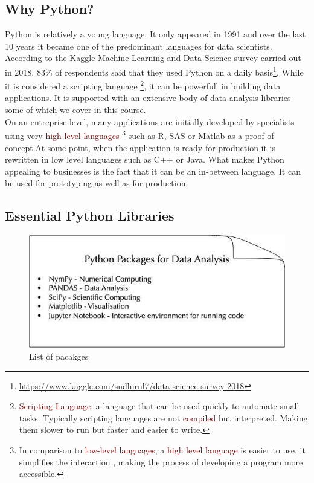 \documentclass{tufte-handout}
\newcommand{\hlred}[1]{\textcolor{Maroon}{#1}}%
\begin{document}
\subsection{Why Python?}\label{sec:why}
Python is relatively a young language. It only appeared in 1991 and over the last 10 years it became one of the predominant languages for data scientists. According to the Kaggle Machine Learning and Data Science  survey carried out in 2018, 83\% of respondents said that they used Python on a daily basis\footnote{\url{https://www.kaggle.com/sudhirnl7/data-science-survey-2018}}. While it is considered a scripting language \footnote{\hlred{Scripting Language}: a language that can be used quickly to automate small tasks. Typically scripting languages are not \hlred{compiled} but interpreted. Making them slower to run but faster and easier to write. }, it can be powerfull in building data applications. It is supported with an extensive body of data analysis libraries some of which we cover in this course. \\
On an entreprise level, many applications are initially developed by specialists using very \hlred{high level languages} \footnote{In comparison to \hlred{low-level languages}, a \hlred{high level language} is easier to use, it simplifies the interaction , making the process of developing a program  more accessible.}  such as R, SAS or Matlab as a proof of concept.At some point, when the application is ready for production it is rewritten in low level languages such as C++ or Java. What makes Python appealing to businesses is the fact that it can be an in-between language. It can be used for prototyping as well as for production. 
\subsection{Essential Python Libraries}\label{sec:libraries}

\begin{figure}[h]%
  \includegraphics[width=\linewidth]{packages.jpg}
  \caption{List of pacakges}
  \label{fig:packages}
\end{figure}
\end{document}
